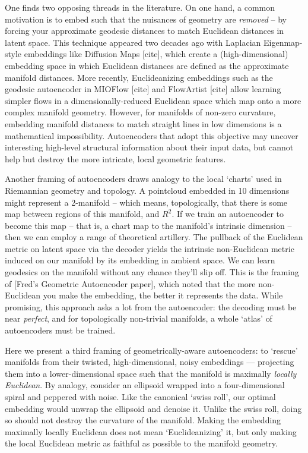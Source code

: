 \documentclass{article}
\theoremstyle{plain}
\theoremstyle{definition}
\theoremstyle{remark}
\begin{document}
One finds two opposing threads in the literature. On one hand, a common motivation is to embed such that the nuisances of geometry are \emph{removed} -- by forcing your approximate geodesic distances to match Euclidean distances in latent space. This technique appeared two decades ago with Laplacian Eigenmap-style embeddings like Diffusion Maps [cite], which create a (high-dimensional) embedding space in which Euclidean distances are defined as the approximate manifold distances. More recently, Euclideanizing embeddings such as the geodesic autoencoder in MIOFlow [cite] and FlowArtist [cite] allow learning simpler flows in a dimensionally-reduced Euclidean space which map onto a more complex manifold geometry. However, for manifolds of non-zero curvature, embedding manifold distances to match straight lines in low dimensions is a mathematical impossibility. Autoencoders that adopt this objective may uncover interesting high-level structural information about their input data, but cannot help but destroy the more intricate, local geometric features.

Another framing of autoencoders draws analogy to the local `charts' used in Riemannian geometry and topology. A pointcloud embedded in 10 dimensions might represent a 2-manifold -- which means, topologically, that there is some map between regions of this manifold, and $R^2$. If we train an autoencoder to become this map -- that is, a chart map to the manifold's intrinsic dimension -- then we can employ a range of theoretical artillery. The pullback of the Euclidean metric on latent space via the decoder yields the intrinsic non-Euclidean metric induced on our manifold by its embedding in ambient space. We can learn geodesics on the manifold without any chance they'll slip off. This is the framing of [Fred's Geometric Autoencoder paper], which noted that the more non-Euclidean you make the embedding, the better it represents the data. While promising, this approach asks a lot from the autoencoder: the decoding must be near \emph{perfect}, and for topologically non-trivial manifolds, a whole `atlas' of autoencoders must be trained.

Here we present a third framing of geometrically-aware autoencoders: to `rescue' manifolds from their twisted, high-dimensional, noisy embeddings --- projecting them into a lower-dimensional space such that the manifold is maximally \emph{locally Euclidean}. By analogy, consider an ellipsoid wrapped into a four-dimensional spiral and peppered with noise. Like the canonical `swiss roll', our optimal embedding would unwrap the ellipsoid and denoise it. Unlike the swiss roll, doing so should not destroy the curvature of the manifold. Making the embedding maximally locally Euclidean does not mean `Euclideanizing' it, but only making the local Euclidean metric as faithful as possible to the manifold geometry.
\end{document}
